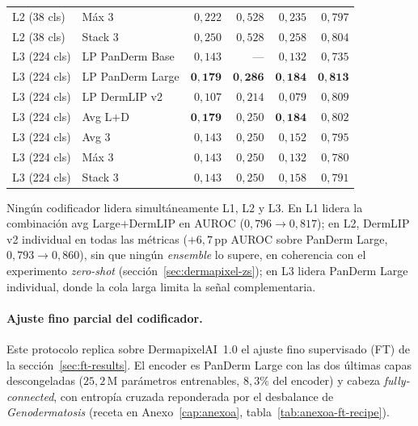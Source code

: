 \begin{table}[H]
\begin{tabular}{llrrrr}
L2 (38 cls)  & Máx 3                       & $0{,}222$          & $0{,}528$          & $0{,}235$          & $0{,}797$ \\
L2 (38 cls)  & Stack 3                     & $0{,}250$          & $0{,}528$          & $0{,}258$          & $0{,}804$ \\
\hline
L3 (224 cls) & LP PanDerm Base             & $0{,}143$          & ---                & $0{,}132$          & $0{,}735$ \\
L3 (224 cls) & LP PanDerm Large            & $\mathbf{0{,}179}$ & $\mathbf{0{,}286}$ & $\mathbf{0{,}184}$ & $\mathbf{0{,}813}$ \\
L3 (224 cls) & LP DermLIP v2               & $0{,}107$          & $0{,}214$          & $0{,}079$          & $0{,}809$ \\
L3 (224 cls) & Avg L$+$D                   & $\mathbf{0{,}179}$ & $0{,}250$          & $\mathbf{0{,}184}$ & $0{,}802$ \\
L3 (224 cls) & Avg 3                       & $0{,}143$          & $0{,}250$          & $0{,}152$          & $0{,}795$ \\
L3 (224 cls) & Máx 3                       & $0{,}143$          & $0{,}250$          & $0{,}132$          & $0{,}780$ \\
L3 (224 cls) & Stack 3                     & $0{,}143$          & $0{,}250$          & $0{,}158$          & $0{,}791$ \\
\hline
\end{tabular}
\end{table}

Ningún codificador lidera simultáneamente L1, L2 y L3. En L1 lidera la
combinación avg Large$+$DermLIP en AUROC ($0{,}796 \to 0{,}817$); en
L2, DermLIP v2 individual en todas las métricas ($+6{,}7$\,pp AUROC
sobre PanDerm Large, $0{,}793 \to 0{,}860$), sin que ningún
\emph{ensemble} lo supere, en coherencia con el experimento
\emph{zero-shot} (sección~\ref{sec:dermapixel-zs}); en L3 lidera
PanDerm Large individual, donde la cola larga limita la señal
complementaria.


\paragraph{Ajuste fino parcial del codificador.}
\label{sec:dermapixel-ft}
\label{sec:dermapixel-ft-l1}
Este protocolo replica sobre DermapixelAI~1.0 el ajuste fino
supervisado (FT) de la sección~\ref{sec:ft-results}. El encoder es
PanDerm Large con las dos últimas capas descongeladas ($25{,}2$\,M
parámetros entrenables, $8{,}3\%$ del encoder) y cabeza
\emph{fully-connected}, con entropía cruzada reponderada por el
desbalance de \emph{Genodermatosis} (receta en
Anexo~\ref{cap:anexoa}, tabla~\ref{tab:anexoa-ft-recipe}).


